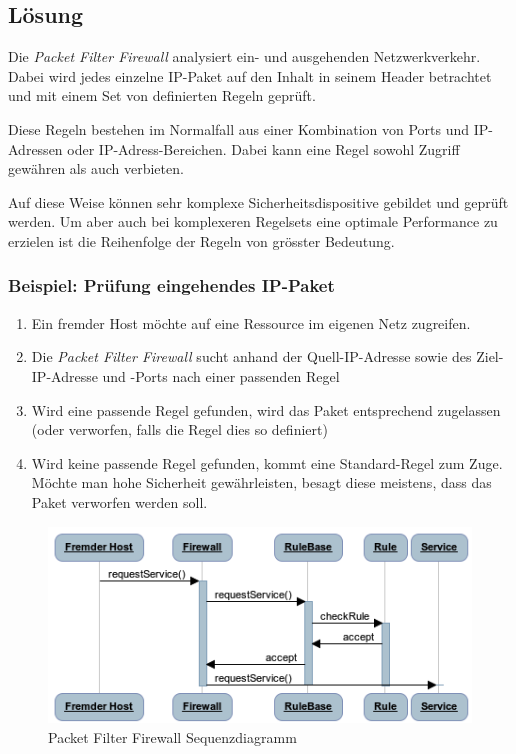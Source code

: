 \subsection*{Lösung}

Die \emph{Packet Filter Firewall} analysiert ein- und ausgehenden Netzwerkverkehr. Dabei wird jedes einzelne IP-Paket auf den Inhalt in seinem Header betrachtet und mit einem Set von definierten Regeln geprüft.

Diese Regeln bestehen im Normalfall aus einer Kombination von Ports und IP-Adressen oder IP-Adress-Bereichen. Dabei kann eine Regel sowohl Zugriff gewähren als auch verbieten.

Auf diese Weise können sehr komplexe Sicherheitsdispositive gebildet und geprüft werden. Um aber auch bei komplexeren Regelsets eine optimale Performance zu erzielen ist die Reihenfolge der Regeln von grösster Bedeutung.

\subsubsection*{Beispiel: Prüfung eingehendes IP-Paket}

\begin{enumerate}
	\item Ein fremder Host möchte auf eine Ressource im eigenen Netz zugreifen.
	\item Die \emph{Packet Filter Firewall} sucht anhand der Quell-IP-Adresse sowie des Ziel-IP-Adresse und -Ports nach einer passenden Regel
	\item Wird eine passende Regel gefunden, wird das Paket entsprechend zugelassen (oder verworfen, falls die Regel dies so definiert)
	\item Wird keine passende Regel gefunden, kommt eine Standard-Regel zum Zuge. Möchte man hohe Sicherheit gewährleisten, besagt diese meistens, dass das Paket verworfen werden soll.
\end{enumerate}

\begin{figure}[H]
	\centering
	\includegraphics[width=12cm]{content/firewall-architectures/images/packet-filter-firewall-sequence.png}
	\caption{Packet Filter Firewall Sequenzdiagramm}
\end{figure}

